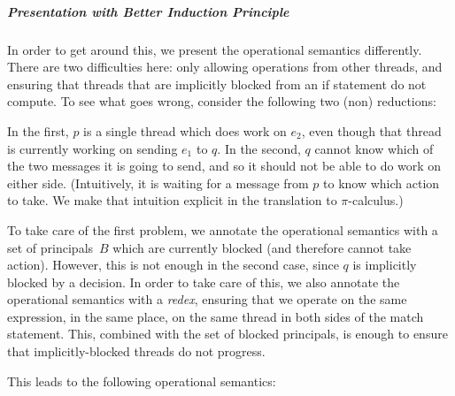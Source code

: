 \documentclass{article}
\theoremstyle{definition}
\newcommand{\To}{\Rightarrow}
\newcommand{\own}[2]{#1.#2}
\newcommand{\send}[3][]{#2\nolinebreak \mathrel{\xrightarrow{#1}}\nolinebreak #3}
\newcommand{\cif}[3]{\textsf{if}~#1 \mathrel{\textsf{then}}\nolinebreak #2 \mathrel{\textsf{else}}\nolinebreak #3}
\begin{document}
\subparagraph{Presentation with Better Induction Principle}
In order to get around this, we present the operational semantics differently.
There are two difficulties here: only allowing operations from other threads, and ensuring that threads that are implicitly blocked from an if statement do not compute.
To see what goes wrong, consider the following two (non) reductions:
\noindent{}
In the first, $p$ is a single thread which does work on $e_2$, even though that thread is currently working on sending $e_1$ to $q$.
In the second, $q$ cannot know which of the two messages it is going to send, and so it should not be able to do work on either side.
(Intuitively, it is waiting for a message from $p$ to know which action to take.
We make that intuition explicit in the translation to $\pi$-calculus.)

To take care of the first problem, we annotate the operational semantics with a set of principals~$B$ which are currently blocked (and therefore cannot take action).
However, this is not enough in the second case, since $q$ is implicitly blocked by a decision.
In order to take care of this, we also annotate the operational semantics with a \emph{redex}, ensuring that we operate on the same expression, in the same place, on the same thread in both sides of the match statement.
This, combined with the set of blocked principals, is enough to ensure that implicitly-blocked threads do not progress.

This leads to the following operational semantics:

\begin{syntax}
\end{syntax}
\end{document}
